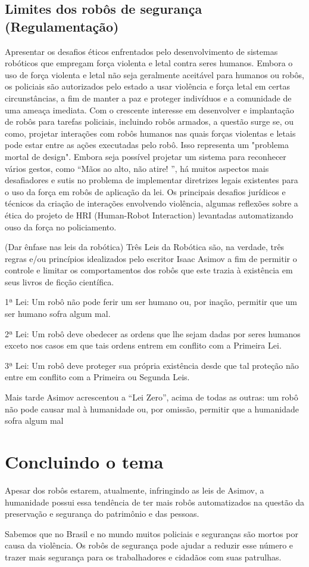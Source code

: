 \documentclass[12pt,a4paper]{article}
\begin{document}
    \subsection{Limites dos robôs de segurança (Regulamentação)}
    Apresentar os desafios éticos enfrentados pelo desenvolvimento de sistemas robóticos que empregam força violenta e letal contra seres humanos. Embora o uso de força violenta e letal não seja geralmente aceitável para humanos ou robôs, os policiais são autorizados pelo estado a usar violência e força letal em certas circunstâncias, a fim de manter a paz e proteger indivíduos e a comunidade de uma ameaça imediata. Com o crescente interesse em desenvolver e implantação de robôs para tarefas policiais, incluindo robôs armados, a questão surge se, ou como, projetar interações com robôs humanos nas quais forças violentas e letais pode estar entre as ações executadas pelo robô. Isso representa um "problema mortal de design". Embora seja possível projetar um sistema para reconhecer vários gestos, como “Mãos ao alto, não atire! ”, há muitos aspectos mais desafiadores e sutis no problema de implementar diretrizes legais existentes para o uso da força em robôs de aplicação da lei. Os principais desafios jurídicos e técnicos da criação de interações envolvendo violência, algumas reflexões sobre a ética do projeto de HRI (Human-Robot Interaction) levantadas automatizando ouso da força no policiamento.  

    (Dar ênfase nas leis da robótica)
    Três Leis da Robótica são, na verdade, três regras e/ou princípios idealizados pelo escritor Isaac Asimov a fim de permitir o controle e limitar os comportamentos dos robôs que este trazia à existência em seus livros de ficção científica.

    1ª Lei: Um robô não pode ferir um ser humano ou, por inação, permitir que um ser humano sofra algum mal.

    2ª Lei: Um robô deve obedecer as ordens que lhe sejam dadas por seres humanos exceto nos casos em que tais ordens entrem em conflito com a Primeira Lei.

    3ª Lei: Um robô deve proteger sua própria existência desde que tal proteção não entre em conflito com a Primeira ou Segunda Leis.

    Mais tarde Asimov acrescentou a “Lei Zero”, acima de todas as outras: um robô não pode causar mal à humanidade ou, por omissão, permitir que a humanidade sofra algum mal

    \section{Concluindo o tema}
    Apesar dos robôs estarem, atualmente, infringindo as leis de Asimov, a humanidade possui essa tendência de ter mais robôs automatizados na questão da preservação e segurança do patrimônio e das pessoas.

    Sabemos que no Brasil e no mundo muitos policiais e seguranças são mortos por causa da violência. Os robôs de segurança pode ajudar a reduzir esse número e trazer mais segurança para os trabalhadores e cidadãos com suas patrulhas.  
\end{document}
